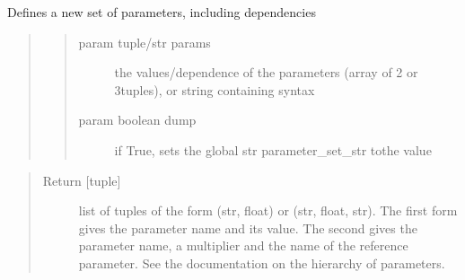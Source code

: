 \documentclass[letterpaper,10pt,english]{sphinxmanual}
\begin{document}
\begin{fulllineitems}
\label{\detokenize{functions:pyqcm.set_parameters}}
\sphinxAtStartPar
Defines a new set of parameters, including dependencies
\begin{quote}
\begin{quote}\begin{description}
\item[{param tuple/str params}] \leavevmode
\sphinxAtStartPar
the values/dependence of the parameters (array of 2\sphinxhyphen{} or 3\sphinxhyphen{}tuples), or string containing syntax

\item[{param boolean dump}] \leavevmode
\sphinxAtStartPar
if True, sets the global str parameter\_set\_str tothe value

\end{description}\end{quote}
\end{quote}
\begin{quote}\begin{description}
\item[{Return {[}tuple{]}}] \leavevmode
\sphinxAtStartPar
list of tuples of the form (str, float) or (str, float, str). The first form gives the parameter name and its value. The second gives the parameter name, a multiplier and the name of the reference parameter. See the documentation on the hierarchy of parameters.

\end{description}\end{quote}

\end{fulllineitems}

\end{document}

